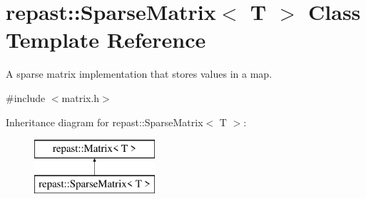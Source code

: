\hypertarget{classrepast_1_1_sparse_matrix}{\section{repast\-:\-:Sparse\-Matrix$<$ T $>$ Class Template Reference}
\label{classrepast_1_1_sparse_matrix}
}


A sparse matrix implementation that stores values in a map.  




{\ttfamily \#include $<$matrix.\-h$>$}

Inheritance diagram for repast\-:\-:Sparse\-Matrix$<$ T $>$\-:\begin{figure}[H]
\begin{center}
\leavevmode
\includegraphics[height=2.000000cm]{classrepast_1_1_sparse_matrix}
\end{center}
\end{figure}
